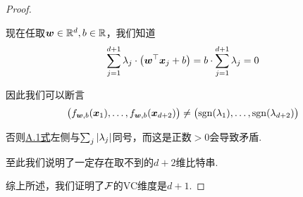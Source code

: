 \begin{proof}
\begin{enumerate}
    现在任取$\boldsymbol{w}\in \mathbb{R}^d, b\in \mathbb{R}$，我们知道 
    \begin{equation} \label{eq:hw2-1}
    \sum_{j=1}^{d+1} \lambda_j \cdot \big(\boldsymbol{w}^{\top}\boldsymbol{x}_j + b\big) = b \cdot \sum_{j=1}^{d+1} \lambda_j = 0
    \end{equation}

    因此我们可以断言
    \[
    \big(
        f_{\boldsymbol{w}, b}(\boldsymbol{x}_1), \dots, f_{\boldsymbol{w}, b}(\boldsymbol{x}_{d+2})
    \big) \neq \big(
        \mathrm{sgn}(\lambda_1), \dots, \mathrm{sgn}(\lambda_{d+2})
    \big)
    \]

    否则\hyperref[eq:hw2-1]{A.1式}左侧与$\sum_j \left\vert\lambda_j\right\vert$同号，而这是正数$>0$会导致矛盾.
    
    至此我们说明了一定存在取不到的$d+2$维比特串.
    
\end{enumerate}
综上所述，我们证明了$\mathcal{F}$的VC维度是$d+1$.
\end{proof}